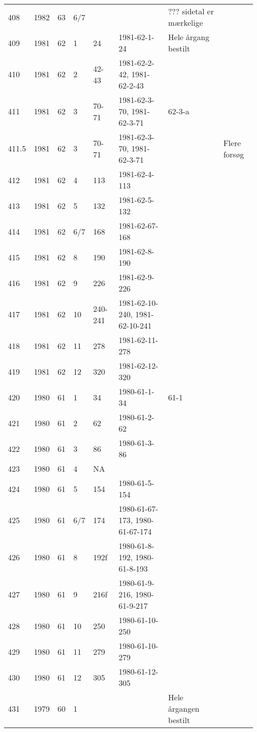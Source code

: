 \begin{longtable}{ |l|l|l|l|l|l|l|l| }
408 & 1982 & 63 &   6/7 &         &                & ??? sidetal er mærkelige & \\
409 & 1981 & 62 &     1 &      24 &   1981-62-1-24 & Hele årgang bestilt & \\
410 & 1981 & 62 &     2 &   42-43 & 1981-62-2-42, 1981-62-2-43 &  & \\
411 & 1981 & 62 &     3 &   70-71 & 1981-62-3-70, 1981-62-3-71 & 62-3-a & \\
411.5 & 1981 & 62 &   3 &   70-71 & 1981-62-3-70, 1981-62-3-71 &  & Flere forsøg \\
412 & 1981 & 62 &     4 &     113 &  1981-62-4-113 &  & \\
413 & 1981 & 62 &     5 &     132 &  1981-62-5-132 &  & \\
414 & 1981 & 62 &   6/7 &     168 & 1981-62-67-168 &  & \\
415 & 1981 & 62 &     8 &     190 &  1981-62-8-190 &  & \\
416 & 1981 & 62 &     9 &     226 &  1981-62-9-226 &  & \\
417 & 1981 & 62 &    10 & 240-241 & 1981-62-10-240, 1981-62-10-241 &  & \\
418 & 1981 & 62 &    11 &     278 & 1981-62-11-278 &  & \\
419 & 1981 & 62 &    12 &     320 & 1981-62-12-320 &  & \\
420 & 1980 & 61 &     1 &      34 &   1980-61-1-34 & 61-1 & \\
421 & 1980 & 61 &     2 &      62 &   1980-61-2-62 &  & \\
422 & 1980 & 61 &     3 &      86 &   1980-61-3-86 &  & \\
423 & 1980 & 61 &     4 &      NA &                &  & \\
424 & 1980 & 61 &     5 &     154 & 1980-61-5-154  &  & \\
425 & 1980 & 61 &   6/7 &     174 & 1980-61-67-173, 1980-61-67-174 &  & \\
426 & 1980 & 61 &     8 &    192f & 1980-61-8-192, 1980-61-8-193 &  & \\
427 & 1980 & 61 &     9 &    216f & 1980-61-9-216, 1980-61-9-217 &  & \\
428 & 1980 & 61 &    10 &     250 & 1980-61-10-250 &  & \\
429 & 1980 & 61 &    11 &     279 & 1980-61-10-279 &  & \\
430 & 1980 & 61 &    12 &     305 & 1980-61-12-305 &  & \\
431 & 1979 & 60 &     1 &         &                & Hele årgangen bestilt & \\

\end{longtable}
